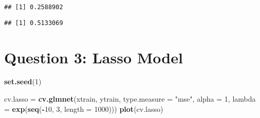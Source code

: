 \documentclass[
]{article}
\newenvironment{Shaded}{\begin{snugshade}}{\end{snugshade}}
\newcommand{\CommentTok}[1]{\textcolor[rgb]{0.56,0.35,0.01}{\textit{#1}}}
\newcommand{\DataTypeTok}[1]{\textcolor[rgb]{0.13,0.29,0.53}{#1}}
\newcommand{\DecValTok}[1]{\textcolor[rgb]{0.00,0.00,0.81}{#1}}
\newcommand{\FloatTok}[1]{\textcolor[rgb]{0.00,0.00,0.81}{#1}}
\newcommand{\KeywordTok}[1]{\textcolor[rgb]{0.13,0.29,0.53}{\textbf{#1}}}
\newcommand{\NormalTok}[1]{#1}
\newcommand{\OperatorTok}[1]{\textcolor[rgb]{0.81,0.36,0.00}{\textbf{#1}}}
\newcommand{\OtherTok}[1]{\textcolor[rgb]{0.56,0.35,0.01}{#1}}
\newcommand{\StringTok}[1]{\textcolor[rgb]{0.31,0.60,0.02}{#1}}
\begin{document}
\begin{Shaded}
\end{Shaded}

\begin{verbatim}
## [1] 0.2588902
\end{verbatim}

\begin{Shaded}
\end{Shaded}

\begin{verbatim}
## [1] 0.5133069
\end{verbatim}

\hypertarget{question-3-lasso-model}{%
\section{Question 3: Lasso Model}\label{question-3-lasso-model}}

\begin{Shaded}
\begin{Highlighting}[]
\KeywordTok{set.seed}\NormalTok{(}\DecValTok{1}\NormalTok{)}

\NormalTok{cv.lasso =}\StringTok{ }\KeywordTok{cv.glmnet}\NormalTok{(xtrain, ytrain, }
                     \DataTypeTok{type.measure =} \StringTok{"mse"}\NormalTok{,}
                     \DataTypeTok{alpha =} \DecValTok{1}\NormalTok{,}
                     \DataTypeTok{lambda =} \KeywordTok{exp}\NormalTok{(}\KeywordTok{seq}\NormalTok{(}\OperatorTok{-}\DecValTok{10}\NormalTok{, }\DecValTok{3}\NormalTok{, }\DataTypeTok{length =} \DecValTok{1000}\NormalTok{)))}
\KeywordTok{plot}\NormalTok{(cv.lasso)}
\end{Highlighting}
\end{Shaded}
\end{document}
